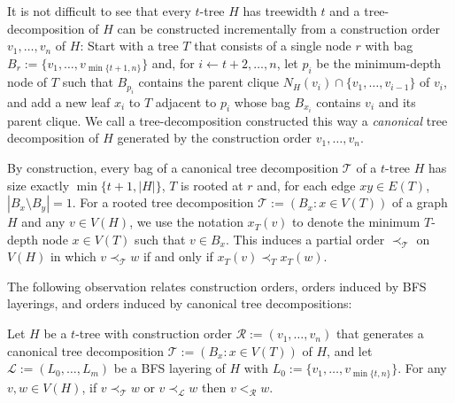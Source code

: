 \documentclass[kpfonts]{patmorin}
\theoremstyle{named}
\begin{document}
It is not difficult to see that every $t$-tree $H$ has treewidth $t$ and a tree-decomposition of $H$ can be constructed incrementally from a construction order $v_1,\ldots,v_n$ of $H$: Start with a tree $T$ that consists of a single node $r$ with bag $B_r:=\{v_1,\ldots,v_{\min\{t+1,n\}}\}$ and, for $i\gets t+2,\ldots,n$, let $p_i$ be the minimum-depth node of $T$ such that $B_{p_i}$ contains the parent clique $N_H(v_i)\cap\{v_1,\ldots,v_{i-1}\}$ of $v_i$, and add a new leaf $x_i$ to $T$ adjacent to $p_i$ whose bag $B_{x_i}$ contains $v_i$ and its parent clique.  We call a tree-decomposition constructed this way a \emph{canonical} tree decomposition of $H$ generated by the construction order $v_1,\ldots,v_n$.

By construction, every bag of a canonical tree decomposition $\mathcal{T}$ of a $t$-tree $H$ has size exactly $\min\{t+1,|H|\}$, $T$ is rooted at $r$ and, for each edge $xy\in E(T)$, $|B_x\setminus B_y|=1$.
For a rooted tree decomposition $\mathcal{T}:=(B_x:x\in V(T))$ of a graph $H$ and any $v\in V(H)$, we use the notation $x_T(v)$ to denote the minimum $T$-depth node $x\in V(T)$ such that $v\in B_x$.  This induces a partial order $\prec_{\mathcal{T}}$ on $V(H)$ in which $v\prec_{\mathcal{T}} w$ if and only if $x_T(v)\prec_T x_T(w)$.

The following observation relates construction orders, orders induced by BFS layerings, and orders induced by canonical tree decompositions:

\begin{obs}\label{order-relation}
    Let $H$ be a $t$-tree with construction order $\mathcal{R}:=(v_1,\ldots,v_n)$ that generates a canonical tree decomposition $\mathcal{T}:=(B_x:x\in V(T))$ of $H$, and let $\mathcal{L}:=(L_0,\ldots,L_m)$ be a BFS layering of $H$ with $L_0:=\{v_1,\ldots,v_{\min\{t,n\}}\}$.  For any $v,w\in V(H)$,
    if $v\prec_{\mathcal{T}} w$ or $v\prec_{\mathcal{L}} w$ then $v<_{\mathcal{R}} w$.
\end{obs}
\end{document}
